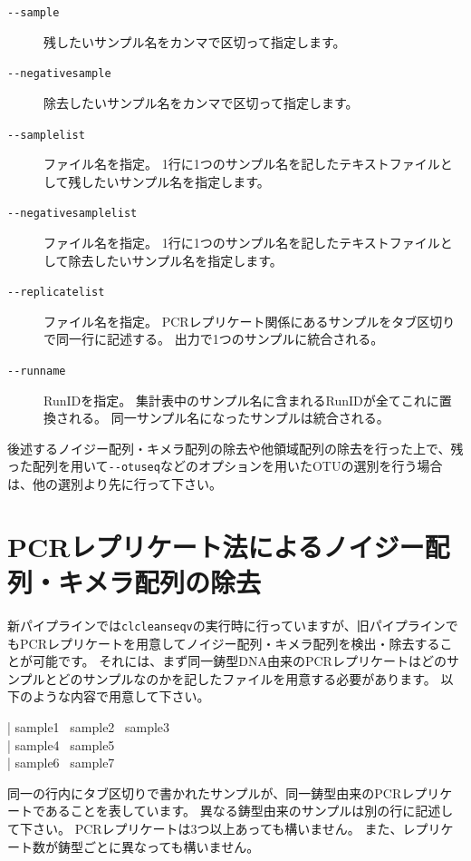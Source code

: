 \documentclass[titlepage,10pt,a4paper,english]{jsbook}
\newenvironment{content}{\begin{shaded}\vspace{-1em}\raggedright\ttfamily\footnotesize\setlength{\baselineskip}{1.4em}}{\end{shaded}\vspace{-1em}}
\begin{document}
\begin{description}
\item[\texttt{{-}{-}sample}] 残したいサンプル名をカンマで区切って指定します。
\item[\texttt{{-}{-}negativesample}] 除去したいサンプル名をカンマで区切って指定します。
\item[\texttt{{-}{-}samplelist}] ファイル名を指定。
1行に1つのサンプル名を記したテキストファイルとして残したいサンプル名を指定します。
\item[\texttt{{-}{-}negativesamplelist}] ファイル名を指定。
1行に1つのサンプル名を記したテキストファイルとして除去したいサンプル名を指定します。
\item[\texttt{{-}{-}replicatelist}] ファイル名を指定。
PCRレプリケート関係にあるサンプルをタブ区切りで同一行に記述する。
出力で1つのサンプルに統合される。
\item[\texttt{{-}{-}runname}] RunIDを指定。
集計表中のサンプル名に含まれるRunIDが全てこれに置換される。
同一サンプル名になったサンプルは統合される。
\end{description}

後述するノイジー配列・キメラ配列の除去や他領域配列の除去を行った上で、残った配列を用いて\texttt{{-}{-}otuseq}などのオプションを用いたOTUの選別を行う場合は、他の選別より先に行って下さい。

\section{PCRレプリケート法によるノイジー配列・キメラ配列の除去}

新パイプラインでは\texttt{clcleanseqv}の実行時に行っていますが、旧パイプラインでもPCRレプリケートを用意してノイジー配列・キメラ配列を検出・除去することが可能です。
それには、まず同一鋳型DNA由来のPCRレプリケートはどのサンプルとどのサンプルなのかを記したファイルを用意する必要があります。
以下のような内容で用意して下さい。
\begin{content}
| sample1~ sample2~ sample3\\
| sample4~ sample5\\
| sample6~ sample7
\end{content}
同一の行内にタブ区切りで書かれたサンプルが、同一鋳型由来のPCRレプリケートであることを表しています。
異なる鋳型由来のサンプルは別の行に記述して下さい。
PCRレプリケートは3つ以上あっても構いません。
また、レプリケート数が鋳型ごとに異なっても構いません。
\end{document}

